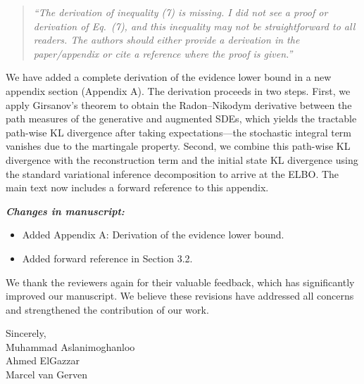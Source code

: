 \documentclass[12pt]{article}
\newcommand{\reviewercomment}[1]{%
  \begin{quote}
  \textcolor{reviewergray}{\textit{``#1''}}
  \end{quote}
}
\newcommand{\changes}{\vspace{0.3em}\noindent\textbf{\textit{Changes in manuscript:}}\vspace{0.2em}}
\begin{document}
\reviewercomment{The derivation of inequality (7) is missing. I did not see a proof or derivation of Eq.\ (7), and this inequality may not be straightforward to all readers. The authors should either provide a derivation in the paper/appendix or cite a reference where the proof is given.}

We have added a complete derivation of the evidence lower bound in a new appendix section (Appendix A). The derivation proceeds in two steps. First, we apply Girsanov's theorem to obtain the Radon--Nikodym derivative between the path measures of the generative and augmented SDEs, which yields the tractable path-wise KL divergence after taking expectations---the stochastic integral term vanishes due to the martingale property. Second, we combine this path-wise KL divergence with the reconstruction term and the initial state KL divergence using the standard variational inference decomposition to arrive at the ELBO. The main text now includes a forward reference to this appendix.

\changes
\begin{itemize}[leftmargin=2em]
\item Added Appendix A: Derivation of the evidence lower bound.
\item Added forward reference in Section 3.2.
\end{itemize}

\vspace{1.5cm}

We thank the reviewers again for their valuable feedback, which has significantly improved our manuscript. We believe these revisions have addressed all concerns and strengthened the contribution of our work.

\vspace{0.8cm}

\noindent Sincerely,\\[0.5cm]
Muhammad Aslanimoghanloo\\
Ahmed ElGazzar\\
Marcel van Gerven
\end{document}
